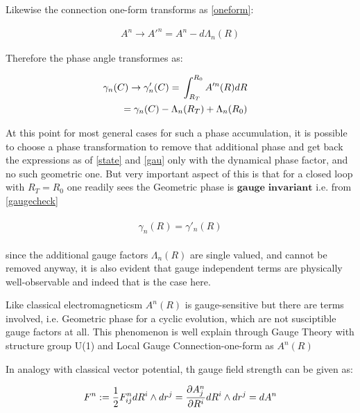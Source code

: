 \documentclass[8pt, twocoloumn]{article}
\begin{document}
Likewise the connection one-form transforms as \ref{oneform}:

\begin{align}
A^n \to A'^n = A^n - d\Lambda_n(R)
\end{align}
 
Therefore the phase angle transformes as: 

\begin{align}{\label{gaugecheck}}
\begin{split}
\gamma_n(C) \to \gamma'_n(C)={}& \int_{R_T}^{R_0}A'^n(R)dR 
\end{split} \notag \\
\begin{split}
={}&\gamma_n(C)-\Lambda_n(R_T)+\Lambda_n(R_0) 
\end{split}
\end{align}

At this point for most general cases for such a phase accumulation, it is possible to choose a phase transformation to remove that additional phase and get back the expressions as of \ref{state} and \ref{gau} only with the dynamical phase factor, and no such geometric one. 
But very important aspect of this is that for a closed loop with $R_T=R_0$ one readily sees the Geometric phase is $\textbf{gauge invariant}$ i.e. from \ref{gaugecheck}

\begin{align}
\begin{split}
\gamma_n(R)=\gamma'_n(R)
\end{split}
\end{align}

since the additional gauge factors $\Lambda_n(R)$ are single valued, and cannot be removed anyway, it is also evident that gauge independent terms are physically well-observable and indeed that is the case here.

Like classical electromagneticsm $A^n(R)$ is gauge-sensitive but there are terms involved, i.e. Geometric phase for a cyclic evolution, which are not susciptible gauge factors at all. This phenomenon is well explain through Gauge Theory with structure group U(1) and Local Gauge Connection-one-form as $A^n(R)$

In analogy with classical vector potential, th gauge field strength can be given as:

\begin{align}{\label{dafg}}
\begin{split}
F^n := \frac{1}{2}F^n_{ij}dR^i \wedge dr^j = \frac{\partial A^n_j}{\partial R^i}dR^i \wedge dr^j=dA^n
\end{split}
\end{align}
\end{document}
